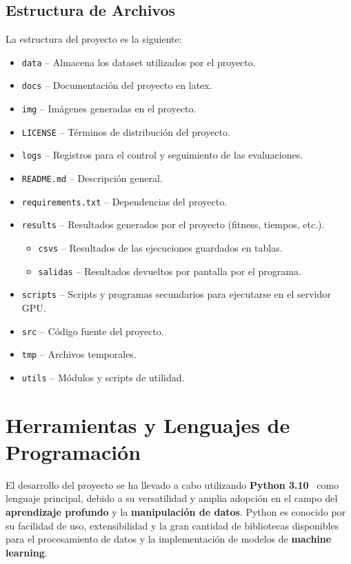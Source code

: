 \subsection{Estructura de Archivos}\label{subsec:estructura-de-archivos}
La estructura del proyecto es la siguiente:
\begin{itemize}
    \item \texttt{data} -- Almacena los dataset utilizados por el proyecto.
    \item \texttt{docs} -- Documentación del proyecto en latex.
    \item \texttt{img} -- Imágenes generadas en el proyecto.
    \item \texttt{LICENSE} -- Términos de distribución del proyecto.
    \item \texttt{logs} -- Registros para el control y seguimiento de las evaluaciones.
    \item \texttt{README.md} -- Descripción general.
    \item \texttt{requirements.txt} -- Dependencias del proyecto.
    \item \texttt{results} -- Resultados generados por el proyecto (fitness, tiempos, etc.).
          \begin{itemize}
              \item \texttt{csvs} -- Resultados de las ejecuciones guardados en tablas.
              \item \texttt{salidas} -- Resultados devueltos por pantalla por el programa.
          \end{itemize}
    \item \texttt{scripts} -- Scripts y programas secundarios para ejecutarse en el servidor GPU\@.
    \item \texttt{src} -- Código fuente del proyecto.
    \item \texttt{tmp} -- Archivos temporales.
    \item \texttt{utils} -- Módulos y scripts de utilidad.
\end{itemize}

\section{Herramientas y Lenguajes de Programación}\label{sec:herramientas-y-lenguajes-de-programacion}
El desarrollo del proyecto se ha llevado a cabo utilizando \textbf{Python 3.10}~\cite{vanderplas_python_2016} como
lenguaje principal, debido a su versatilidad y amplia adopción en el campo del \textbf{aprendizaje profundo} y la
\textbf{manipulación de datos}.
Python es conocido por su facilidad de uso, extensibilidad y la gran cantidad de bibliotecas disponibles para el
procesamiento de datos y la implementación de modelos de \textbf{machine learning}. \\[6pt]

